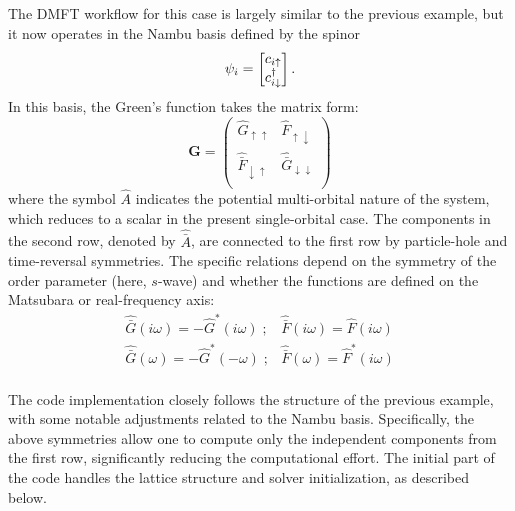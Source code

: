 \documentclass[edipack_sp.tex]{subfiles}
\begin{document}
The DMFT workflow for this case is largely similar to the previous 
example, but it now operates in the Nambu basis defined by the spinor
$$
\psi_i=\begin{bmatrix} c_{i\uparrow} \\ c^\dagger_{i\downarrow} \end{bmatrix}. 
$$
In this basis, the Green's function takes the matrix form:
\begin{equation}
  {\mathbf G} =
  \begin{pmatrix}
    \hat{G}_{\uparrow\uparrow} & \hat{F}_{\uparrow\downarrow}\\
    \hat{\bar{F}}_{\downarrow\uparrow}  &    \hat{\bar{G}}_{\downarrow\downarrow} \\
  \end{pmatrix}
\end{equation}
where the symbol $\hat{A}$ indicates the potential multi-orbital 
nature of the system, which reduces to a scalar in the present 
single-orbital case. The components in the second row, denoted 
by $\hat{\bar{A}}$, are connected to the first row by particle-hole 
and time-reversal symmetries. The specific relations depend on the 
symmetry of the order parameter (here, $s$-wave) and whether the 
functions are defined on the Matsubara or real-frequency axis:
\begin{equation}
\begin{array}{cc}
  \hat{\bar{G}}(i\omega) = -\hat{G}^*(i\omega)\;; &  \hat{\bar{F}}(i\omega) = \hat{F}(i\omega)\\
  \hat{\bar{G}}(\omega)  = -\hat{G}^*(-\omega) \;; & \hat{\bar{F}}(\omega) = \hat{F}^*(i\omega)\\
\end{array}
\end{equation}  

The code implementation closely follows the structure of the previous 
example, with some notable adjustments related to the Nambu basis. 
Specifically, the above symmetries allow one to compute only the 
independent components from the first row, significantly reducing 
the computational effort. The initial part of the code handles the 
lattice structure and solver initialization, as described below.
\end{document}
